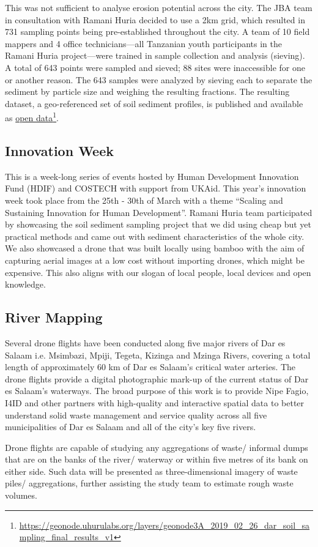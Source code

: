\documentclass[a4paper,12pt,twoside]{article}
\begin{document}
\begin{multicols}{2}
This was not sufficient to analyse erosion potential across the city. The JBA team in consultation with Ramani Huria decided to use a 2km grid, which resulted in 731 sampling points being pre-established throughout the city. A team of 10 field mappers and 4 office technicians—all Tanzanian youth participants in the Ramani Huria project—were trained in sample collection and analysis (sieving). A total of 643 points were sampled and sieved; 88 sites were inaccessible for one or another reason.
The 643 samples were analyzed by sieving each to separate the sediment by particle size and weighing the resulting fractions. The resulting dataset, a geo-referenced set of soil sediment profiles, is published and available as \href{https://geonode.uhurulabs.org/layers/geonode3A_2019_02_26_dar_soil_sampling_final_results_v1}{open data}\footnote{\url{https://geonode.uhurulabs.org/layers/geonode3A_2019_02_26_dar_soil_sampling_final_results_v1}}.

\subsection{Innovation Week}
This is a week-long series of events hosted by Human Development Innovation Fund (HDIF) and COSTECH with support from UKAid. This year’s innovation week took place from the 25th - 30th of March with a theme “Scaling and Sustaining Innovation for Human Development”. Ramani Huria team participated by showcasing the soil sediment sampling project that we did using cheap but yet practical methods and came out with sediment characteristics of the whole city.
We also showcased a drone that was built locally using bamboo with the aim of capturing aerial images at a low cost without importing drones, which might be expensive. This also aligns with our slogan of local people, local devices and open knowledge.

\subsection{River Mapping}
Several drone flights have been conducted along five major rivers of Dar es Salaam i.e. Msimbazi, Mpiji, Tegeta, Kizinga and Mzinga Rivers, covering a total length of approximately 60 km of Dar es Salaam’s critical water arteries. The drone flights provide a digital photographic mark-up of the current status of Dar es Salaam’s waterways. The broad purpose of this work is to provide Nipe Fagio, I4ID and other partners with high-quality and interactive spatial data to better understand solid waste management and service quality across all five municipalities of Dar es Salaam and all of the city’s key five rivers.

Drone flights are capable of studying any aggregations of waste/ informal dumps that are on the banks of the river/ waterway or within five metres of its bank on either side. 
Such data will be presented as three-dimensional imagery of waste piles/ aggregations, further assisting the study team to estimate rough waste volumes.
\end{multicols}
\end{document}
